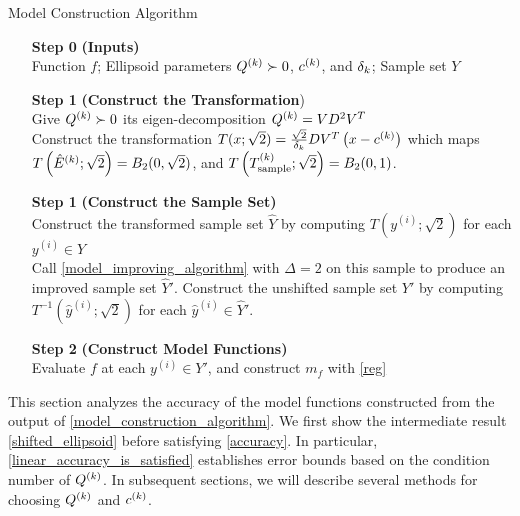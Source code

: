 {
\begin{fullwidth}[leftmargin=0in, rightmargin=0in, width=\linewidth-0.25in]
\begin{flushleft}

\begin{algorithm}[H]
    \caption{Model Construction Algorithm}
    \label{model_construction_algorithm}
    \begin{itemize}
        \item[\textbf{Step 0}] \textbf{(Inputs)} \\
			Function $f$;
			Ellipsoid parameters ${Q^{(k)}} \succ 0$, $c^{(k)}$, and $\delta_k$;
        	Sample set $Y$
        \item[\textbf{Step 1}] \textbf{(Construct the Transformation}) \\
        	Give ${Q^{(k)}} \succ 0$ its eigen-decomposition ${Q^{(k)}} = VD^2V^T$  \\
			Construct the transformation $T(x; \sqrt{2}) = \frac{\sqrt{2}}{\delta_k} D V^T\left(x - c^{(k)}\right)$ which maps
				$T\left({{\hat E}^{(k)}}; \sqrt{2}\right) = B_2(0, \sqrt{2})$, and
				$T\left({T_{\text{sample}}^{(k)}}; \sqrt{2}\right) = B_2(0, 1)$.
        \item[\textbf{Step 1}] \textbf{(Construct the Sample Set)} \\
        Construct the transformed sample set $\hat Y$ by computing $T\left(y^{(i)}; \sqrt{2}\right)$ for each $y^{(i)} \in Y$ \\
        Call \cref{model_improving_algorithm} with $\Delta = 2$ on this sample to produce an improved sample set $\hat Y '$.
        Construct the unshifted sample set $Y'$ by computing $T^{-1}\left(\hat y^{(i)}; \sqrt{2}\right)$ for each $\hat y^{(i)} \in \hat Y'$.
        \item[\textbf{Step 2}] \textbf{(Construct Model Functions)} \\
        Evaluate $f$ at each $y^{(i)} \in Y'$, and construct $m_f$ with \cref{reg}
    \end{itemize}
\end{algorithm}


\end{flushleft}
\end{fullwidth}
}

This section analyzes the accuracy of the model functions constructed from the output of \cref{model_construction_algorithm}.
We first show the intermediate result
\cref{shifted_ellipsoid}
before satisfying \cref{accuracy}.
In particular, \cref{linear_accuracy_is_satisfied} establishes error bounds based on the condition number of ${Q^{(k)}}$.
In subsequent sections, we will describe several methods for choosing ${Q^{(k)}}$ and $c^{(k)}$.

